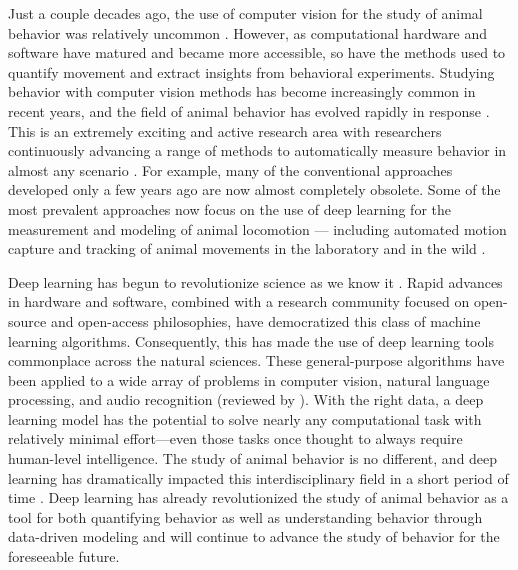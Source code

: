 Just a couple decades ago, the use of computer vision for the study of animal behavior was relatively uncommon \citep{dell2014automated}. However, as computational hardware and software have matured and became more accessible, so have the methods used to quantify movement and extract insights from behavioral experiments. Studying behavior with computer vision methods has become increasingly common in recent years, and the field of animal behavior has evolved rapidly in response \citep{anderson2014toward, berman2018measuring, brown2018ethology}. This is an extremely exciting and active research area with researchers continuously advancing a range of methods to automatically measure behavior in almost any scenario \citep{dell2014automated, anderson2014toward, graving2019deepposekit, mathis2020deep}. For example, many of the conventional approaches developed only a few years ago are now almost completely obsolete. Some of the most prevalent approaches now focus on the use of deep learning for the measurement and modeling of animal locomotion \citep{graving2019deepposekit, mathis2020deep, luxem2020identifying, graving2020vaesne} --- including automated motion capture and tracking of animal movements in the laboratory and in the wild \citep{nath2018, graving2019deepposekit, francisco2020high}. 

Deep learning has begun to revolutionize science as we know it \citep{lecun2015deep}. Rapid advances in hardware and software, combined with a research community focused on open-source and open-access philosophies, have democratized this class of machine learning algorithms. Consequently, this has made the use of deep learning tools commonplace across the natural sciences. These general-purpose algorithms have been applied to a wide array of problems in computer vision, natural language processing, and audio recognition (reviewed by \citealt{lecun2015deep}). With the right data, a deep learning model has the potential to solve nearly any computational task with relatively minimal effort---even those tasks once thought to always require human-level intelligence. The study of animal behavior is no different, and deep learning has dramatically impacted this interdisciplinary field in a short period of time \citep{graving2019deepposekit, mathis2020deep}. Deep learning has already revolutionized the study of animal behavior as a tool for both quantifying behavior \citep{mathis2018deeplabcut, pereira2019fast, romero2018idtracker, graving2019deepposekit} as well as understanding behavior through data-driven modeling \citep{johnson2016composing, luxem2020identifying, graving2020vaesne} and will continue to advance the study of behavior for the foreseeable future. 

